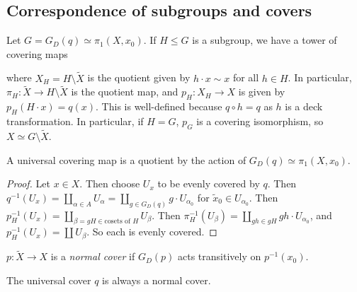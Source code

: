 \subsection{Correspondence of subgroups and covers}
\begin{proposition}
	Let \( G = G_D(q) \simeq \pi_1(X, x_0) \).
	If \( H \leq G \) is a subgroup, we have a tower of covering maps
	\begin{center}
	\end{center}
	where \( X_H = H \setminus \widetilde X \) is the quotient given by \( h \cdot x \sim x \) for all \( h \in H \).
	In particular, \( \pi_H \colon \widetilde X \to H \setminus \widetilde X \) is the quotient map, and \( p_H \colon X_H \to X \) is given by \( p_H(H \cdot x) = q(x) \).
	This is well-defined because \( q \circ h = q \) as \( h \) is a deck transformation.
	In particular, if \( H = G \), \( p_G \) is a covering isomorphism, so \( X \simeq G \setminus \widetilde X \).
\end{proposition}
A universal covering map is a quotient by the action of \( G_D(q) \simeq \pi_1(X,x_0) \).
\begin{proof}
	Let \( x \in X \).
	Then choose \( U_x \) to be evenly covered by \( q \).
	Then \( q^{-1}(U_x) = \coprod_{\alpha \in A} U_\alpha = \coprod_{g \in G_D(q)} g \cdot U_{\alpha_0} \) for \( \widetilde x_0 \in U_{\alpha_0} \).
	Then \( p_H^{-1}(U_x) = \coprod_{\beta = gH \in \text{cosets of } H} U_\beta \).
	Then \( \pi_H^{-1}(U_\beta) = \coprod_{gh \in gH} gh \cdot U_{\alpha_0} \), and \( p_H^{-1}(U_x) = \coprod U_\beta \).
	So each is evenly covered.
\end{proof}
\begin{definition}
	\( p \colon \widetilde X \to X \) is a \emph{normal cover} if \( G_D(p) \) acts transitively on \( p^{-1}(x_0) \).
\end{definition}
\begin{example}
	The universal cover \( q \) is always a normal cover.
\end{example}
